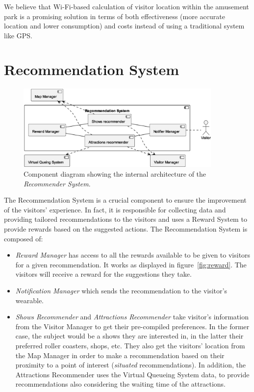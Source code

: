 We believe that Wi-Fi-based calculation of visitor location within the amusement park is a promising solution in terms of both effectiveness
(more accurate location and lower consumption) and costs instead of using a traditional system like GPS.

\section{Recommendation System}

\begin{figure}[H]
	\centering
	\includegraphics[width=0.9\textwidth]{img/recommender.eps}
	\caption{Component diagram showing the internal architecture of the \textit{Recommender System}.
	}
	\label{fig:recommender-arch}
\end{figure}

The Recommendation System is a crucial component to ensure the improvement of the visitors' experience.
In fact, it is responsible for collecting data and providing tailored recommendations to the visitors and uses a Reward System to provide rewards based on the suggested actions.
The Recommendation System is composed of:
\begin{itemize}
	\item \textit{Reward Manager} has access to all the rewards available to be given to visitors for a given recommendation. It works as displayed in figure~\ref{fig:reward}.
	The visitors will receive a reward for the suggestions they take.
	\item \textit{Notification Manager} which sends the recommendation to the visitor's wearable.
	\item \textit{Shows Recommender} and \textit{Attractions Recommender} take visitor's information from the Visitor Manager to get their pre-compiled preferences.
	In the former case, the subject would be a shows they are interested in, in the latter their preferred roller coasters, shops, etc. They also get the visitors' location from the Map Manager in order to make a recommendation based on their proximity to a point of interest (\textit{situated} recommendations).
	In addition, the Attractions Recommender uses the Virtual Queueing System data, to provide recommendations also considering the waiting time of the attractions.
\end{itemize}


